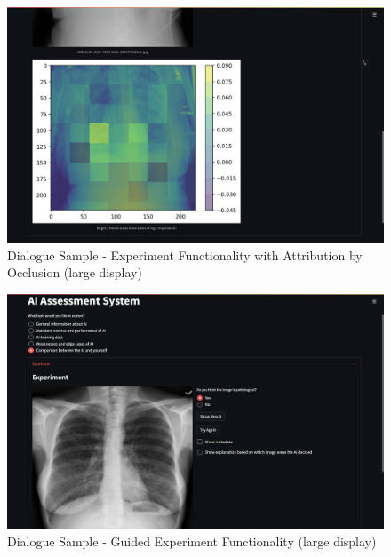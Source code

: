 \documentclass[11pt,a4paper,english]{scrreprt}
\begin{document}
\begin{figure}[htbp]
    \centering
    \includegraphics[width=\textwidth]{img/screenshots/samples/large/l_experiment_occlusion.png}
    \caption{Dialogue Sample - Experiment Functionality with Attribution by Occlusion (large display)}
    \label{fig:samples_l_experiment_occlusion}
\end{figure}

\begin{figure}[htbp]
    \centering
    \includegraphics[width=\textwidth]{img/screenshots/samples/large/l_experiment_guided_active.png}
    \caption{Dialogue Sample - Guided Experiment Functionality (large display)}
    \label{fig:samples_l_experiment_guided}
\end{figure}
\end{document}
